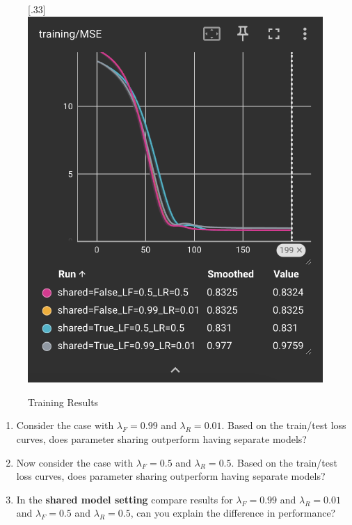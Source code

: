 \begin{figure}[H]
{    }
    [.33\linewidth]{%
    \includegraphics[width=\linewidth]{./figures/training_MSE}%
}%
    \caption{Training Results}
    \medskip
    \small
\end{figure}


\begin{enumerate}
    \item {} Consider the case with $\lambda_F=0.99$ and $\lambda_R=0.01$. Based on the train/test loss curves, does parameter sharing outperform having separate models? 
    
    \item {} Now consider the case with $\lambda_F=0.5$ and $\lambda_R=0.5$.  Based on the train/test loss curves, does parameter sharing outperform having separate models? 
    
    \item {} In the \textbf{shared model setting} compare results for $\lambda_F=0.99$ and $\lambda_R=0.01$ and $\lambda_F=0.5$ and $\lambda_R=0.5$, can you explain the difference in performance?
\end{enumerate}